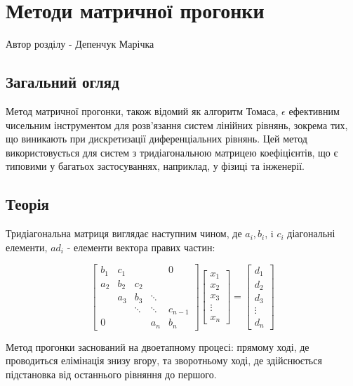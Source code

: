 \chapter{Методи матричної прогонки}

Автор розділу - Депенчук Марічка

\section{Загальний огляд}

Метод матричної прогонки, також відомий як алгоритм Томаса, $\epsilon$ ефективним чисельним інструментом 
для розв'язання систем лінійних рівнянь, зокрема тих, що виникають при дискретизації диференціальних рівнянь. 
Цей метод використовується для систем з тридіагональною матрицею коефіцієнтів, що є типовими у багатьох застосуваннях, 
наприклад, у фізиці та інженерії.

\section{Теорія}

Тридіагональна матриця виглядає наступним чином, де $a_{i}, b_{i}$, i $c_{i}$ діагональні елементи, $a d_{i}$ - елементи вектора правих частин:

$$
\left[\begin{array}{ccccc}
b_{1} & c_{1} & & & 0 \\
a_{2} & b_{2} & c_{2} & & \\
& a_{3} & b_{3} & \ddots & \\
& & \ddots & \ddots & c_{n-1} \\
0 & & & a_{n} & b_{n}
\end{array}\right]\left[\begin{array}{c}
x_{1} \\
x_{2} \\
x_{3} \\
\vdots \\
x_{n}
\end{array}\right]=\left[\begin{array}{c}
d_{1} \\
d_{2} \\
d_{3} \\
\vdots \\
d_{n}
\end{array}\right]
$$

Метод прогонки заснований на двоетапному процесі: прямому ході, де проводиться елімінація знизу вгору, та зворотньому ході, де здійснюється підстановка від останнього рівняння до першого.

